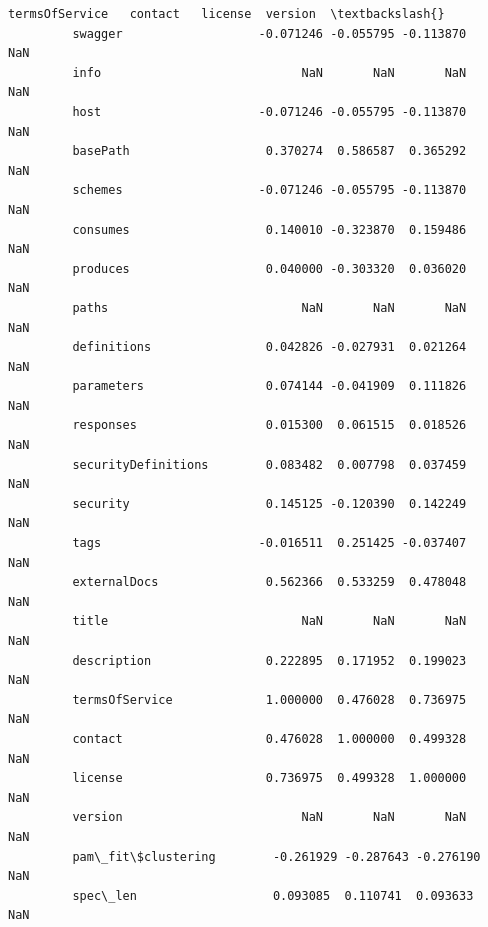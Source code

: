 \documentclass[11pt]{article}
\begin{document}
\begin{Verbatim}[commandchars=\\\{\}]
                              termsOfService   contact   license  version  \textbackslash{}
         swagger                   -0.071246 -0.055795 -0.113870      NaN   
         info                            NaN       NaN       NaN      NaN   
         host                      -0.071246 -0.055795 -0.113870      NaN   
         basePath                   0.370274  0.586587  0.365292      NaN   
         schemes                   -0.071246 -0.055795 -0.113870      NaN   
         consumes                   0.140010 -0.323870  0.159486      NaN   
         produces                   0.040000 -0.303320  0.036020      NaN   
         paths                           NaN       NaN       NaN      NaN   
         definitions                0.042826 -0.027931  0.021264      NaN   
         parameters                 0.074144 -0.041909  0.111826      NaN   
         responses                  0.015300  0.061515  0.018526      NaN   
         securityDefinitions        0.083482  0.007798  0.037459      NaN   
         security                   0.145125 -0.120390  0.142249      NaN   
         tags                      -0.016511  0.251425 -0.037407      NaN   
         externalDocs               0.562366  0.533259  0.478048      NaN   
         title                           NaN       NaN       NaN      NaN   
         description                0.222895  0.171952  0.199023      NaN   
         termsOfService             1.000000  0.476028  0.736975      NaN   
         contact                    0.476028  1.000000  0.499328      NaN   
         license                    0.736975  0.499328  1.000000      NaN   
         version                         NaN       NaN       NaN      NaN   
         pam\_fit\$clustering        -0.261929 -0.287643 -0.276190      NaN   
         spec\_len                   0.093085  0.110741  0.093633      NaN   
         

\end{Verbatim}
\end{document}
